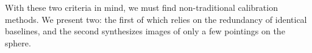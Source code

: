 With these two criteria in mind, we must find non-traditional calibration methods. We present two:
the first of which relies on the redundancy of identical baselines, and the second synthesizes images of
only a few pointings on the sphere.




